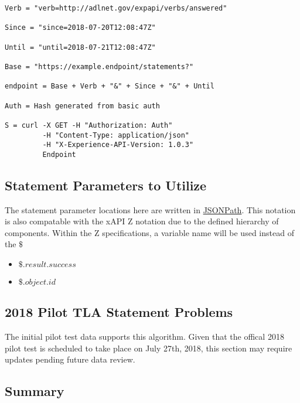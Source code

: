 \documentclass{article}
\begin{document}
\begin{lstlisting}[frame=single]
Verb = "verb=http://adlnet.gov/expapi/verbs/answered"

Since = "since=2018-07-20T12:08:47Z"

Until = "until=2018-07-21T12:08:47Z"

Base = "https://example.endpoint/statements?"

endpoint = Base + Verb + "&" + Since + "&" + Until

Auth = Hash generated from basic auth

S = curl -X GET -H "Authorization: Auth"
         -H "Content-Type: application/json"
         -H "X-Experience-API-Version: 1.0.3"
         Endpoint
\end{lstlisting}

\subsection{Statement Parameters to Utilize}
The statement parameter locations here are written in
\href{http://goessner.net/articles/JsonPath/}{JSONPath}. This notation
is also compatable with the xAPI Z notation due to the defined
hierarchy of components. Within the Z specifications, a variable name
will be used instead of the $\$$
\begin{itemize}
\item $\$.result.success$
\item $\$.object.id$
\end{itemize}

\subsection{2018 Pilot TLA Statement Problems}
The initial pilot test data supports this algorithm.
Given that the offical 2018 pilot test is scheduled to take place on July
27th, 2018, this section may require updates pending future data review.

\subsection{Summary}
\end{document}

